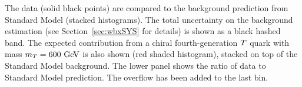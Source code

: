         The data (solid black points) are compared to the background 
        prediction from Standard Model (stacked histograms). 
        The total uncertainty on the background estimation 
        (see Section~\ref{sec:wbxSYS} for details) is shown as a black hashed band.
        The expected contribution from a chiral fourth-generation 
        $\T$ quark with mass $m_{\T}=600\gev$ is also shown (red shaded histogram), 
        stacked on top of the Standard Model background. 
        The lower panel shows the ratio of data to Standard Model prediction. 
        The overflow has been added to the last bin.

